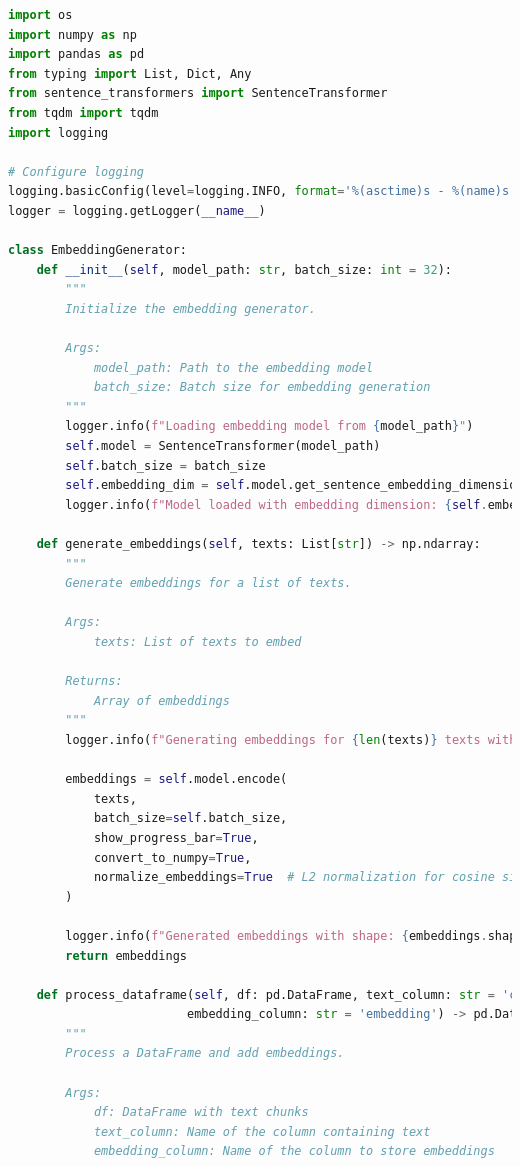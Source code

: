 \documentclass[
  screen,review,acmlarge]{acmart}
\begin{document}
\begin{lstlisting}[language=Python]
import os
import numpy as np
import pandas as pd
from typing import List, Dict, Any
from sentence_transformers import SentenceTransformer
from tqdm import tqdm
import logging

# Configure logging
logging.basicConfig(level=logging.INFO, format='%(asctime)s - %(name)s - %(levelname)s - %(message)s')
logger = logging.getLogger(__name__)

class EmbeddingGenerator:
    def __init__(self, model_path: str, batch_size: int = 32):
        """
        Initialize the embedding generator.
        
        Args:
            model_path: Path to the embedding model
            batch_size: Batch size for embedding generation
        """
        logger.info(f"Loading embedding model from {model_path}")
        self.model = SentenceTransformer(model_path)
        self.batch_size = batch_size
        self.embedding_dim = self.model.get_sentence_embedding_dimension()
        logger.info(f"Model loaded with embedding dimension: {self.embedding_dim}")
    
    def generate_embeddings(self, texts: List[str]) -> np.ndarray:
        """
        Generate embeddings for a list of texts.
        
        Args:
            texts: List of texts to embed
            
        Returns:
            Array of embeddings
        """
        logger.info(f"Generating embeddings for {len(texts)} texts with batch size {self.batch_size}")
        
        embeddings = self.model.encode(
            texts,
            batch_size=self.batch_size,
            show_progress_bar=True,
            convert_to_numpy=True,
            normalize_embeddings=True  # L2 normalization for cosine similarity
        )
        
        logger.info(f"Generated embeddings with shape: {embeddings.shape}")
        return embeddings
    
    def process_dataframe(self, df: pd.DataFrame, text_column: str = 'chunk_text',
                         embedding_column: str = 'embedding') -> pd.DataFrame:
        """
        Process a DataFrame and add embeddings.
        
        Args:
            df: DataFrame with text chunks
            text_column: Name of the column containing text
            embedding_column: Name of the column to store embeddings
            

\end{lstlisting}
\end{document}
